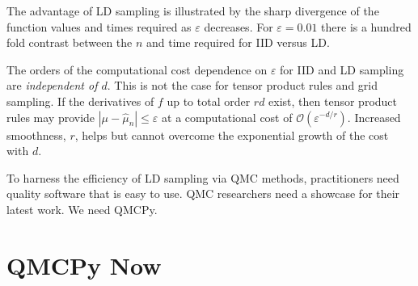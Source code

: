 \documentclass[11pt]{NSFamsart}
\def\abs#1{\ensuremath{\left \lvert #1 \right \rvert}}
\newcommand{\Order}{\mathcal{O}}
\newcommand{\hmu}{\hat{\mu}}
\begin{document}
The advantage of LD sampling is illustrated by the sharp divergence of the function values and times required as $\varepsilon$ decreases.  For $\varepsilon = 0.01$ there is a hundred fold contrast between the $n$ and time required for IID versus LD.

The orders of the computational cost dependence on $\varepsilon$ for IID and LD sampling are \emph{independent of $d$}.  This is not the case for tensor product rules and grid sampling.  If the derivatives of $f$ up to total order $rd$ exist, then tensor product rules may provide $\abs{\mu - \hmu_n} \le \varepsilon$  at a computational cost of $\Order(\varepsilon^{-d/r})$.   Increased smoothness, $r$, helps but cannot overcome the exponential growth of the cost with $d$.

To harness the efficiency of LD sampling via QMC methods, practitioners need quality software that is easy to use.  QMC researchers need a showcase  for their latest work.  We need QMCPy.

\section{QMCPy Now}

\end{document}
